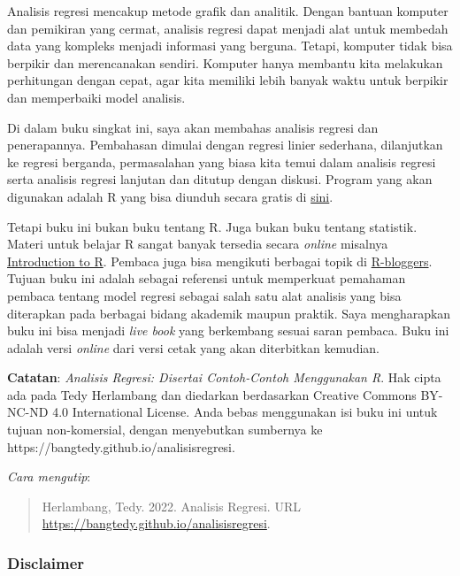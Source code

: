 \documentclass[
]{book}
\begin{document}
Analisis regresi mencakup metode grafik dan analitik. Dengan bantuan komputer dan pemikiran yang cermat, analisis regresi dapat menjadi alat untuk membedah data yang kompleks menjadi informasi yang berguna. Tetapi, komputer tidak bisa berpikir dan merencanakan sendiri. Komputer hanya membantu kita melakukan perhitungan dengan cepat, agar kita memiliki lebih banyak waktu untuk berpikir dan memperbaiki model analisis.

Di dalam buku singkat ini, saya akan membahas analisis regresi dan penerapannya. Pembahasan dimulai dengan regresi linier sederhana, dilanjutkan ke regresi berganda, permasalahan yang biasa kita temui dalam analisis regresi serta analisis regresi lanjutan dan ditutup dengan diskusi. Program yang akan digunakan adalah R \citep{rcoreteam2021} yang bisa diunduh secara gratis di \href{https://www.r-project.org/}{sini}.

Tetapi buku ini bukan buku tentang R. Juga bukan buku tentang statistik. Materi untuk belajar R sangat banyak tersedia secara \emph{online} misalnya \href{https://cran.r-project.org/doc/manuals/r-devel/R-intro.html}{Introduction to R}. Pembaca juga bisa mengikuti berbagai topik di \href{https://www.r-bloggers.com/}{R-bloggers}. Tujuan buku ini adalah sebagai referensi untuk memperkuat pemahaman pembaca tentang model regresi sebagai salah satu alat analisis yang bisa diterapkan pada berbagai bidang akademik maupun praktik. Saya mengharapkan buku ini bisa menjadi \emph{live book} yang berkembang sesuai saran pembaca. Buku ini adalah versi \emph{online} dari versi cetak yang akan diterbitkan kemudian.

\textbf{Catatan}: \emph{Analisis Regresi: Disertai Contoh-Contoh Menggunakan R}. Hak cipta ada pada Tedy Herlambang dan diedarkan berdasarkan Creative Commons BY-NC-ND 4.0 International License. Anda bebas menggunakan isi buku ini untuk tujuan non-komersial, dengan menyebutkan sumbernya ke https://bangtedy.github.io/analisisregresi.

\emph{Cara mengutip}:

\begin{quote}
Herlambang, Tedy. 2022. Analisis Regresi. URL \url{https://bangtedy.github.io/analisisregresi}.
\end{quote}

\hypertarget{disclaimer}{%
\subsubsection*{Disclaimer}\label{disclaimer}}
\end{document}
